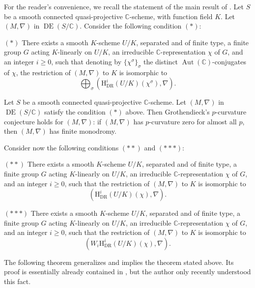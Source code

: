 For the reader's convenience, we recall the statement of the main result of \cite{Ka-ASDE}. Let \(S\) be a smooth connected quasi-projective \(\mathbb{C}\)-scheme, with function field \(K\). Let \((M,\nabla)\) in \(\operatorname{DE}(S/\mathbb{C})\). Consider the following condition \((*)\):

\((*)\) There exists a smooth \(K\)-scheme \(U/K\), separated and of finite type, a finite group \(G\) acting \(K\)-linearly on \(U/K\), an irreducible \(\mathbb{C}\)-representation \(\chi\) of \(G\), and an integer \(i\geq0\), such that denoting by \(\{\chi^\sigma\}_\sigma\) the distinct \(\operatorname{Aut}(\mathbb{C})\)-conjugates of \(\chi\), the restriction of \((M,\nabla)\) to \(K\) is isomorphic to
\[
\bigoplus_\sigma(\mathrm{H}^i_{\mathrm{DR}}(U/K)(\chi^\sigma),\nabla).
\]

\cite[5.7]{Ka-ASDE} Let \(S\) be a smooth connected quasi-projective \(\mathbb{C}\)-scheme. Let \((M,\nabla)\) in \(\operatorname{DE}(S/\mathbb{C})\) satisfy the condition \((*)\) above. Then Grothendieck's \(p\)-curvature conjecture holds for \((M,\nabla)\): if \((M,\nabla)\) has \(p\)-curvature zero for almost all \(p\), then \((M,\nabla)\) has finite monodromy.

Consider now the following conditions \((**)\) and \((***)\):

\((**)\) There exists a smooth \(K\)-scheme \(U/K\), separated and of finite type, a finite group \(G\) acting \(K\)-linearly on \(U/K\), an irreducible \(\mathbb{C}\)-representation \(\chi\) of \(G\), and an integer \(i\geq0\), such that the restriction of \((M,\nabla)\) to \(K\) is isomorphic to
\[
(\mathrm{H}^i_{\mathrm{DR}}(U/K)(\chi),\nabla).
\]

\((***)\) There exists a smooth \(K\)-scheme \(U/K\), separated and of finite type, a finite group \(G\) acting \(K\)-linearly on \(U/K\), an irreducible \(\mathbb{C}\)-representation \(\chi\) of \(G\), and an integer \(i\geq0\), such that the restriction of \((M,\nabla)\) to \(K\) is isomorphic to
\[
(W_i\mathrm{H}^i_{\mathrm{DR}}(U/K)(\chi),\nabla).
\]

The following theorem generalizes and implies the theorem \cite[5.7]{Ka-ASDE} stated above. Its proof is essentially already contained in \cite{Ka-ASDE}, but the author only recently understood this fact.

